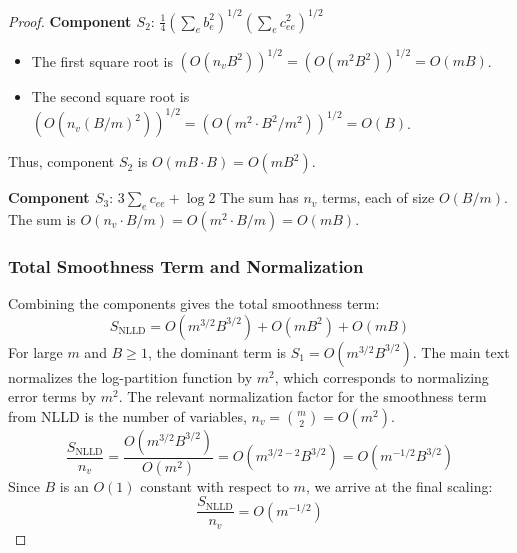 \documentclass[12pt]{article}
\numberwithin{equation}{section}
\begin{document}
\begin{proof}
\textbf{Component $S_2$}: $\frac{1}{4} \left( \sum_{e}^{} b_e^2 \right)^{1/2} \left( \sum_{e}^{} c_{ee}^2 \right)^{1/2}$
\begin{itemize}
    \item The first square root is $(O(n_v B^2))^{1/2} = (O(m^2 B^2))^{1/2} = O(mB)$.
    \item The second square root is $(O(n_v (B/m)^2))^{1/2} = (O(m^2 \cdot B^2/m^2))^{1/2} = O(B)$.
\end{itemize}
Thus, component $S_2$ is $O(mB \cdot B) = O(m B^2)$.

\textbf{Component $S_3$}: $3 \sum_{e}^{} c_{ee} + \log 2$
The sum has $n_v$ terms, each of size $O(B/m)$. The sum is $O(n_v \cdot B/m) = O(m^2 \cdot B/m) = O(mB)$.

\subsubsection*{Total Smoothness Term and Normalization}
Combining the components gives the total smoothness term:
$$ S_{\text{NLLD}} = O(m^{3/2} B^{3/2}) + O(m B^2) + O(mB) $$
For large $m$ and $B \ge 1$, the dominant term is $S_1 = O(m^{3/2} B^{3/2})$. The main text normalizes the log-partition function by $m^2$, which corresponds to normalizing error terms by $m^2$. The relevant normalization factor for the smoothness term from NLLD is the number of variables, $n_v = \binom{m}{2} = O(m^2)$.
$$ \frac{S_{\text{NLLD}}}{n_v} = \frac{O(m^{3/2} B^{3/2})}{O(m^2)} = O(m^{3/2 - 2} B^{3/2}) = O(m^{-1/2} B^{3/2}) $$
Since $B$ is an $O(1)$ constant with respect to $m$, we arrive at the final scaling:
$$ \frac{S_{\text{NLLD}}}{n_v} = O(m^{-1/2}) $$

\end{proof}
\end{document}
